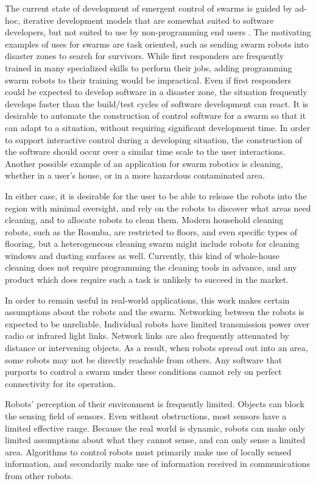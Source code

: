 \documentclass[]{article}
\begin{document}
The current state of development of emergent control of swarms is guided by ad-hoc, iterative development models that are somewhat suited to software developers, but not suited to use by non-programming end users \cite{palmer2005behavioral}.
The motivating examples of uses for swarms are task oriented, such as sending swarm robots into disaster zones to search for survivors. 
While first responders are frequently trained in many specialized skills to perform their jobs, adding programming swarm robots to their training would be impractical. 
Even if first responders could be expected to develop software in a disaster zone, the situation frequently develops faster than the build/test cycles of software development can react. 
It is desirable to automate the construction of control software for a swarm so that it can adapt to a situation, without requiring significant development time. 
In order to support interactive control during a developing situation, the construction of the software should occur over a similar time scale to the user interactions.
Another possible example of an application for swarm robotics is cleaning, whether in a user's house, or in a more hazardous contaminated area. 

In either case, it is desirable for the user to be able to release the robots into the region with minimal oversight, and rely on the robots to discover what areas need cleaning, and to allocate robots to clean them. 
Modern household cleaning robots, such as the Roomba, are restricted to floors, and even specific types of flooring, but a heterogeneous cleaning swarm might include robots for cleaning windows and dusting surfaces as well. 
Currently, this kind of whole-house cleaning does not require programming the cleaning tools in advance, and any product which does require such a task is unlikely to succeed in the market. 

In order to remain useful in real-world applications, this work makes certain assumptions about the robots and the swarm. 
Networking between the robots is expected to be unreliable. 
Individual robots have limited transmission power over radio or infrared light links. 
Network links are also frequently attenuated by distance or intervening objects. 
As a result, when robots spread out into an area, some robots may not be directly reachable from others. 
Any software that purports to control a swarm under these conditions cannot rely on perfect connectivity for its operation. 

Robots' perception of their environment is frequently limited. 
Objects can block the sensing field of sensors.
Even without obstructions, most sensors have a limited effective range. 
Because the real world is dynamic, robots can make only limited assumptions about what they cannot sense, and can only sense a limited area. 
Algorithms to control robots must primarily make use of locally sensed information, and secondarily make use of information received in communications from other robots. 
\end{document}
